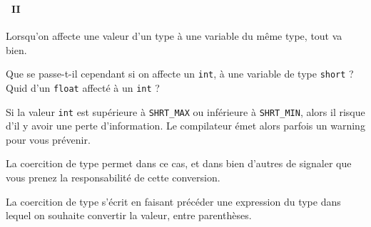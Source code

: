 \begin{frame}[containsverbatim]
  \frametitle{\secname}
  \framesubtitle{\subsecname~II}
  
  Lorsqu'on affecte une valeur d'un type à une variable du même type, tout va bien. 
  \par
  Que se passe-t-il cependant si on affecte un \verb|int|, à une variable de type \verb|short| ? Quid d'un \verb|float| affecté à un \verb|int| ? 
  \par
  Si la valeur \verb|int| est supérieure à \verb|SHRT_MAX| ou inférieure à \verb|SHRT_MIN|, alors il risque 
  d'il y avoir une perte d'information. Le compilateur émet alors parfois un warning pour vous prévenir.
  \vspace{0.5cm}
  \par
  La coercition de type permet dans ce cas, et dans bien d'autres de signaler que vous prenez la responsabilité de cette conversion.
  \vspace{0.5cm}
  \par
  La coercition de type s'écrit en faisant précéder une expression du type dans lequel on souhaite convertir la valeur, entre parenthèses.
\end{frame}

